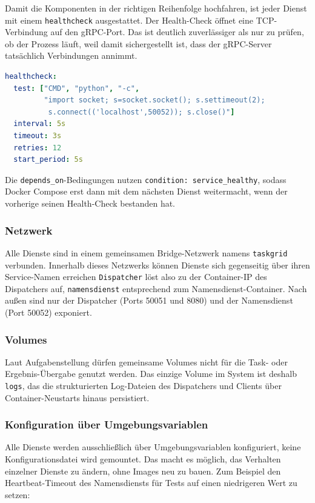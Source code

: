 Damit die Komponenten in der richtigen Reihenfolge hochfahren, ist jeder Dienst
mit einem \texttt{healthcheck} ausgestattet. Der Health-Check öffnet eine
TCP-Verbindung auf den gRPC-Port. Das ist deutlich zuverlässiger als nur zu
prüfen, ob der Prozess läuft, weil damit sichergestellt ist, dass der gRPC-Server
tatsächlich Verbindungen annimmt.

\begin{lstlisting}[language=yaml,caption={Health-Check (Beispiel Namensdienst)}]
healthcheck:
  test: ["CMD", "python", "-c",
         "import socket; s=socket.socket(); s.settimeout(2);
          s.connect(('localhost',50052)); s.close()"]
  interval: 5s
  timeout: 3s
  retries: 12
  start_period: 5s
\end{lstlisting}

Die \texttt{depends\_on}-Bedingungen nutzen \texttt{condition: service\_healthy},
sodass Docker Compose erst dann mit dem nächsten Dienst weitermacht, wenn der
vorherige seinen Health-Check bestanden hat.

\subsubsection*{Netzwerk}

Alle Dienste sind in einem gemeinsamen Bridge-Netzwerk namens \texttt{taskgrid}
verbunden. Innerhalb dieses Netzwerks können Dienste sich gegenseitig über ihren
Service-Namen erreichen \texttt{Dispatcher} löst also zu der Container-IP des
Dispatchers auf, \texttt{namensdienst} entsprechend zum Namensdienst-Container.
Nach außen sind nur der Dispatcher (Ports 50051 und 8080) und der Namensdienst
(Port 50052) exponiert.

\subsubsection*{Volumes}

Laut Aufgabenstellung dürfen gemeinsame Volumes nicht für die Task- oder
Ergebnis-Übergabe genutzt werden. Das einzige Volume im System ist deshalb
\texttt{logs}, das die strukturierten Log-Dateien des Dispatchers und Clients
über Container-Neustarts hinaus persistiert.

\subsubsection*{Konfiguration über Umgebungsvariablen}

Alle Dienste werden ausschließlich über Umgebungsvariablen konfiguriert,
keine Konfigurationsdatei wird gemountet. Das macht es möglich, das Verhalten
einzelner Dienste zu ändern, ohne Images neu zu bauen. Zum Beispiel den
Heartbeat-Timeout des Namensdiensts für Tests auf einen niedrigeren Wert zu setzen:

